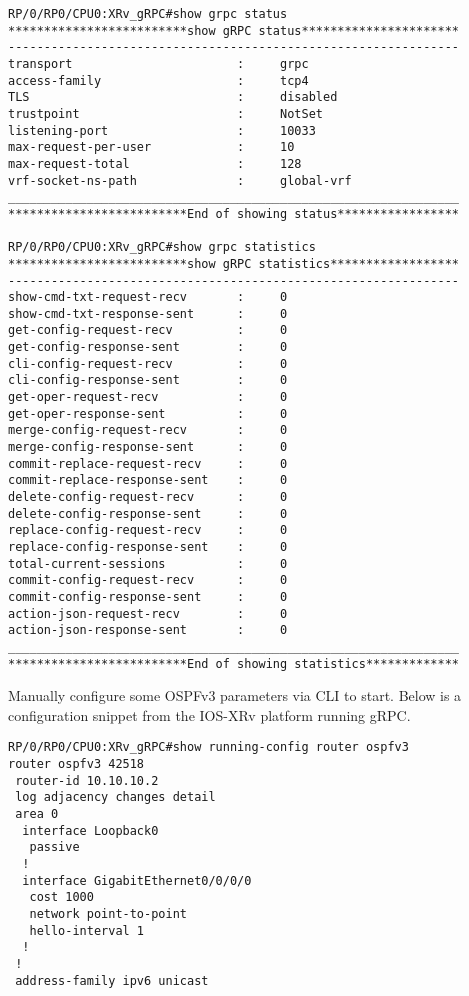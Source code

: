 \begin{verbatim}
RP/0/RP0/CPU0:XRv_gRPC#show grpc status
*************************show gRPC status**********************
---------------------------------------------------------------
transport                       :     grpc
access-family                   :     tcp4
TLS                             :     disabled
trustpoint                      :     NotSet
listening-port                  :     10033
max-request-per-user            :     10
max-request-total               :     128
vrf-socket-ns-path              :     global-vrf
_______________________________________________________________
*************************End of showing status*****************

RP/0/RP0/CPU0:XRv_gRPC#show grpc statistics 
*************************show gRPC statistics******************
---------------------------------------------------------------
show-cmd-txt-request-recv       :     0
show-cmd-txt-response-sent      :     0
get-config-request-recv         :     0
get-config-response-sent        :     0
cli-config-request-recv         :     0
cli-config-response-sent        :     0
get-oper-request-recv           :     0
get-oper-response-sent          :     0
merge-config-request-recv       :     0
merge-config-response-sent      :     0
commit-replace-request-recv     :     0
commit-replace-response-sent    :     0
delete-config-request-recv      :     0
delete-config-response-sent     :     0
replace-config-request-recv     :     0
replace-config-response-sent    :     0
total-current-sessions          :     0
commit-config-request-recv      :     0
commit-config-response-sent     :     0
action-json-request-recv        :     0
action-json-response-sent       :     0
_______________________________________________________________
*************************End of showing statistics*************
\end{verbatim}

Manually configure some OSPFv3 parameters via CLI to start. Below is a
configuration snippet from the IOS-XRv platform running gRPC\@.

\begin{verbatim}
RP/0/RP0/CPU0:XRv_gRPC#show running-config router ospfv3
router ospfv3 42518
 router-id 10.10.10.2
 log adjacency changes detail
 area 0
  interface Loopback0
   passive
  !
  interface GigabitEthernet0/0/0/0
   cost 1000
   network point-to-point
   hello-interval 1
  !
 !
 address-family ipv6 unicast
\end{verbatim}

